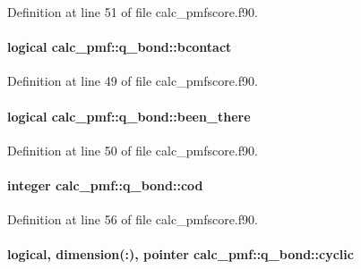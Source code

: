 Definition at line 51 of file calc\-\_\-pmfscore.\-f90.

\hypertarget{structcalc__pmf_1_1q__bond_ae73e05a4a3a78995e09e5ab0aad5d7c4}{
\paragraph[{bcontact}]{\setlength{\rightskip}{0pt plus 5cm}logical calc\-\_\-pmf\-::q\-\_\-bond\-::bcontact}}\label{structcalc__pmf_1_1q__bond_ae73e05a4a3a78995e09e5ab0aad5d7c4}


Definition at line 49 of file calc\-\_\-pmfscore.\-f90.

\hypertarget{structcalc__pmf_1_1q__bond_afbe332024661127ec257e15013d302ee}{
\paragraph[{been\-\_\-there}]{\setlength{\rightskip}{0pt plus 5cm}logical calc\-\_\-pmf\-::q\-\_\-bond\-::been\-\_\-there}}\label{structcalc__pmf_1_1q__bond_afbe332024661127ec257e15013d302ee}


Definition at line 50 of file calc\-\_\-pmfscore.\-f90.

\hypertarget{structcalc__pmf_1_1q__bond_a5cdcbd8d3daf0405d37f6b85ebb7144b}{
\paragraph[{cod}]{\setlength{\rightskip}{0pt plus 5cm}integer calc\-\_\-pmf\-::q\-\_\-bond\-::cod}}\label{structcalc__pmf_1_1q__bond_a5cdcbd8d3daf0405d37f6b85ebb7144b}


Definition at line 56 of file calc\-\_\-pmfscore.\-f90.

\hypertarget{structcalc__pmf_1_1q__bond_a8e9ba2622c4e9d5a527e2b5ae52ce3a2}{
\paragraph[{cyclic}]{\setlength{\rightskip}{0pt plus 5cm}logical, dimension(\-:), pointer calc\-\_\-pmf\-::q\-\_\-bond\-::cyclic}}\label{structcalc__pmf_1_1q__bond_a8e9ba2622c4e9d5a527e2b5ae52ce3a2}


